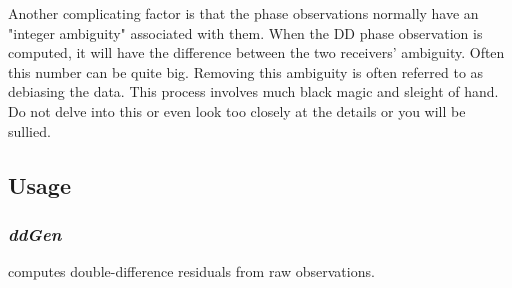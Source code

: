 Another complicating factor is that the phase observations normally
have an "integer ambiguity" associated with them. When the DD phase
observation is computed, it will have the difference between the two
receivers' ambiguity. Often this number can be quite big. Removing this
ambiguity is often referred to as debiasing the data. This process
involves much black magic and sleight of hand. Do not delve into this
or even look too closely at the details or you will be sullied.

\subsection{Usage}
\subsubsection{\emph{ddGen}}
 computes double-difference residuals from raw observations.
